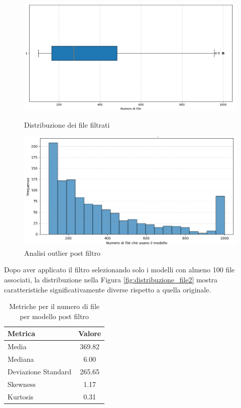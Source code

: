 \documentclass{article}
\begin{document}
\begin{figure}[h]
    \centering
    \begin{minipage}{0.45\textwidth}
        \centering
        \includegraphics[width=\linewidth]{images/approccio3.png}
        \caption{Distribuzione dei file filtrati}
        \label{fig:distribuzione_file2}
    \end{minipage}
    \hfill
    \begin{minipage}{0.45\textwidth}
        \centering
        \includegraphics[width=\linewidth]{images/approccio4.png}
        \caption{Analisi outlier post filtro}
        \label{fig:outlier_file2}
    \end{minipage}
\end{figure}
Dopo aver applicato il filtro selezionando solo i modelli con almeno 100 file associati, la distribuzione nella Figura \ref{fig:distribuzione_file2} mostra caratteristiche significativamente diverse rispetto a quella originale.\\
\begin{table}[h]
    \centering
    \begin{tabular}{|l|c|}
        \hline
        \textbf{Metrica} & \textbf{Valore} \\
        \hline
        Media & 369.82 \\
        Mediana & 6.00 \\
        Deviazione Standard & 265.65 \\
        Skewness & 1.17 \\
        Kurtosis & 0.31 \\
        \hline
    \end{tabular}
    \caption{Metriche per il numero di file per modello post filtro}
    \label{tab:metriche_file_modello2}
\end{table}\\
\end{document}
